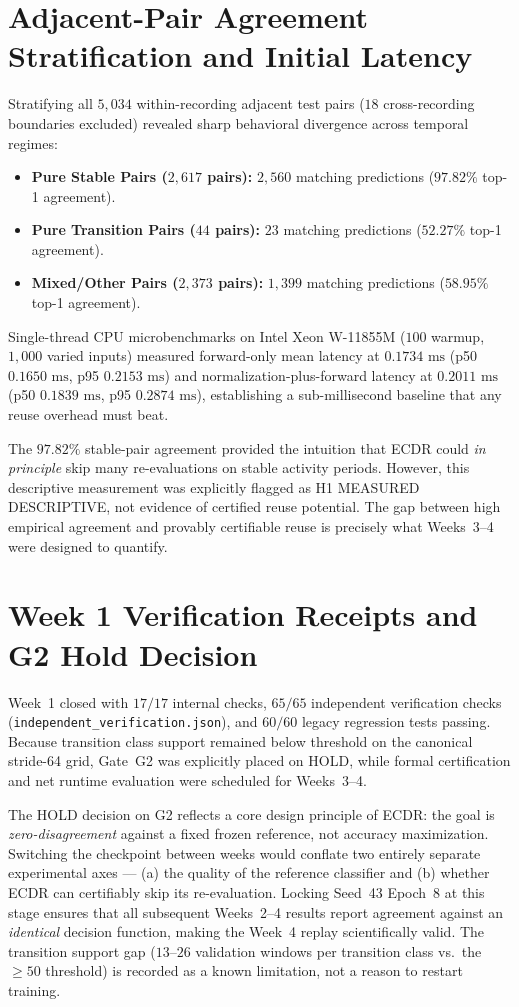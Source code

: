 \documentclass[11pt,oneside,a4paper]{report}
\newcommand{\code}[1]{{\small\upshape\ttfamily #1}}
\newcommand{\pathcode}[1]{{\small\upshape\ttfamily\nolinkurl{#1}}}
\theoremstyle{remark}
\begin{document}
\section{Adjacent-Pair Agreement Stratification and Initial Latency}
Stratifying all $5{,}034$ within-recording adjacent test pairs ($18$ cross-recording boundaries excluded) revealed sharp behavioral divergence across temporal regimes:
\begin{itemize}[leftmargin=1.5em]
  \item \textbf{Pure Stable Pairs ($2{,}617$ pairs):} $2{,}560$ matching predictions ($97.82\%$ top-1 agreement).
  \item \textbf{Pure Transition Pairs ($44$ pairs):} $23$ matching predictions ($52.27\%$ top-1 agreement).
  \item \textbf{Mixed/Other Pairs ($2{,}373$ pairs):} $1{,}399$ matching predictions ($58.95\%$ top-1 agreement).
\end{itemize}
Single-thread CPU microbenchmarks on Intel Xeon W-11855M ($100$ warmup, $1{,}000$ varied inputs) measured forward-only mean latency at $0.1734\text{ ms}$ (p50 $0.1650\text{ ms}$, p95 $0.2153\text{ ms}$) and normalization-plus-forward latency at $0.2011\text{ ms}$ (p50 $0.1839\text{ ms}$, p95 $0.2874\text{ ms}$), establishing a sub-millisecond baseline that any reuse overhead must beat.

The $97.82\%$ stable-pair agreement provided the intuition that ECDR could \emph{in principle} skip many re-evaluations on stable activity periods. However, this descriptive measurement was explicitly flagged as \code{H1 MEASURED DESCRIPTIVE}, not evidence of certified reuse potential. The gap between high empirical agreement and provably certifiable reuse is precisely what Weeks~3--4 were designed to quantify.

\section{Week 1 Verification Receipts and \code{G2} Hold Decision}
Week~1 closed with $17/17$ internal checks, $65/65$ independent verification checks (\pathcode{independent_verification.json}), and $60/60$ legacy regression tests passing. Because transition class support remained below threshold on the canonical stride-64 grid, Gate~\code{G2} was explicitly placed on \code{HOLD}, while formal certification and net runtime evaluation were scheduled for Weeks~3--4.

The \code{HOLD} decision on \code{G2} reflects a core design principle of ECDR: the goal is \emph{zero-disagreement} against a fixed frozen reference, not accuracy maximization. Switching the checkpoint between weeks would conflate two entirely separate experimental axes --- (a) the quality of the reference classifier and (b) whether ECDR can certifiably skip its re-evaluation. Locking Seed~43 Epoch~8 at this stage ensures that all subsequent Weeks~2--4 results report agreement against an \emph{identical} decision function, making the Week~4 replay scientifically valid. The transition support gap ($13$--$26$ validation windows per transition class vs.\ the $\geq 50$ threshold) is recorded as a known limitation, not a reason to restart training.
\end{document}
